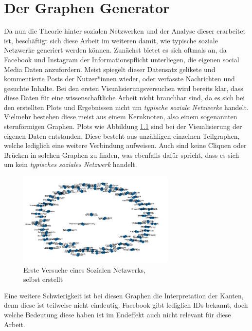 \chapter{Der Graphen Generator}\label{ch:generierung}
Da nun die Theorie hinter sozialen Netzwerken und der Analyse dieser erarbeitet ist, beschäftigt sich diese Arbeit im weiteren damit, wie typische soziale Netzwerke generiert werden können. 
Zunächst bietet es sich oftmals an, da Facebook und Instagram der Informationspflicht unterliegen, die eigenen social Media Daten anzufordern. Meist spiegelt dieser Datensatz gelikete und kommentierte Posts der Nutzer*innen wieder, oder verfasste Nachrichten und gesuchte Inhalte.
Bei den ersten Visualisierungsversuchen wird bereits klar, dass diese Daten für eine wissenschaftliche Arbeit nicht brauchbar sind, da es sich bei den erstellten Plots und Ergebnissen nicht um \textit{ typische soziale Netzwerke} handelt. Vielmehr bestehen diese meist aus einem Kernknoten, also einem sogenannten sternförmigen Graphen. Plots wie Abbildung \ref{fig:OwnData} sind bei der Visualisierung der eigenen Daten entstanden. Diese besteht aus unzähligen einzelnen Teilgraphen, welche lediglich eine weitere Verbindung aufweisen. Auch sind keine Cliquen oder Brücken in solchen Graphen zu finden, was ebenfalls dafür spricht, dass es sich um kein \textit{typisches soziales Netzwerk} handelt. \\
\FloatBarrier
\begin{figure}[h!]
    \centering
    \includegraphics[width=0.7\textwidth]{Graphics/PlotOwnData.png}
    \caption{Erste Versuche eines Sozialen Netzwerks, \\
    selbst erstellt}
    \label{fig:OwnData}
\end{figure}
\FloatBarrier

Eine weitere Schwierigkeit ist bei diesen Graphen die Interpretation der Kanten, denn diese ist teilweise nicht eindeutig. 
Facebook gibt lediglich IDs bekannt, doch welche Bedeutung diese haben ist im Endeffekt auch nicht relevant für diese Arbeit.

